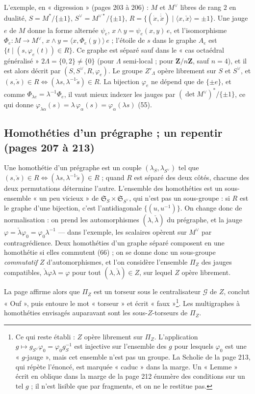 \documentclass[11pt,a4paper]{article}
\begin{document}
L'exemple, en « digression » (pages 203 à 206) : $M$ et $M^{\vee}$ libres de
rang $2$ en dualité, $S = M^{*}/\{\pm 1\}$, $S^{\vee} = M^{\vee *}/\{\pm 1\}$,
$R = \{(\dot x, \dot{\check x}) \mid \langle x, \check x \rangle = \pm 1\}$. Une
jauge $e$ de $M$ donne la forme alternée $\psi_e$, $x \wedge y = \psi_e(x, y)\,
e$, et l'isomorphisme $\Phi_e : M \to M^{\vee}$, $x \wedge y = \langle x,
\Phi_e(y)\rangle\, e$ ; l'étoile de $s$ dans le graphe $A_e$ est $\{t \mid (s,
\varphi_e(t)) \in R\}$. Ce graphe est séparé sauf dans le « cas octaédral
généralisé » $2\Lambda = \{0, 2\} \neq \{0\}$ (pour $\Lambda$ semi-local ; pour
$\mathbf{Z}/n\mathbf{Z}$, sauf $n = 4$), et il est alors décrit par $(S,
S^{\vee}, R, \varphi_e)$. Le groupe $Z'_\Lambda$ opère librement sur $S$ et
$S^{\vee}$, et $(s, \check s) \in R \iff (\lambda s, \lambda^{-1}\check s) \in R$.
La bijection $\varphi_e$ ne dépend que de $\{\pm e\}$, et comme $\Phi_{\lambda e}
= \lambda^{-1}\Phi_e$, il vaut mieux indexer les jauges par $(\det
M^{\vee})^{*}/\{\pm 1\}$, ce qui donne $\varphi_{\lambda\alpha}(s) =
\lambda\,\varphi_\alpha(s) = \varphi_\alpha(\lambda s)$ (55).

\subsection*{Homothéties d'un prégraphe ; un repentir (pages 207 à 213)}

Une homothétie d'un prégraphe est un couple $(\lambda_S, \lambda_{S^{\vee}})$
tel que $(s, \check s) \in R \iff (\lambda s, \lambda^{-1}\check s) \in R$ ;
quand $R$ est séparé des deux côtés, chacune des deux permutations détermine
l'autre. L'ensemble des homothéties est un sous-ensemble « un peu vicieux » de
$\mathfrak{S}_S \times \mathfrak{S}_{S^{\vee}}$, qui n'est pas un sous-groupe :
si $R$ est le graphe d'une bijection, c'est l'antidiagonale $\{(u, u^{-1})\}$. On
change donc de normalisation : on prend les automorphismes $(\lambda,
\check\lambda)$ du prégraphe, et la jauge $\varphi = \check\lambda\varphi_0 =
\varphi_0\lambda^{-1}$ --- dans l'exemple, les scalaires opèrent sur $M^{\vee}$
par contragrédience. Deux homothéties d'un graphe séparé composent en une
homothétie si elles commutent (66) ; on se donne donc un sous-groupe
\emph{commutatif} $Z$ d'automorphismes, et l'on considère l'ensemble $\Pi_Z$
des jauges compatibles, $\check\lambda\varphi\lambda = \varphi$ pour tout
$(\lambda, \check\lambda) \in Z$, sur lequel $Z$ opère librement.

La page affirme alors que $\Pi_Z$ est un torseur sous le centralisateur
$\mathcal{G}$ de $Z$, conclut « Ouf », puis entoure le mot « torseur » et écrit
« faux »\footnote{Ce qui reste établi : $Z$ opère librement sur $\Pi_Z$.
L'application $g \mapsto g_{S^{\vee}}\varphi_0 = \varphi_0 g_S^{-1}$ est
injective sur l'ensemble des $g$ pour lesquels $\varphi_0$ est une
« $g$-jauge », mais cet ensemble n'est pas un groupe. La Scholie de la page 213,
qui répète l'énoncé, est marquée « caduc » dans la marge. Un « Lemme » écrit en oblique dans la marge de la page 212 énumère des conditions sur un tel $g$ ; il n'est lisible que par fragments, et on ne le restitue pas.}. Les multigraphes à
homothéties envisagés auparavant sont les sous-$Z$-torseurs de $\Pi_Z$.
\end{document}
